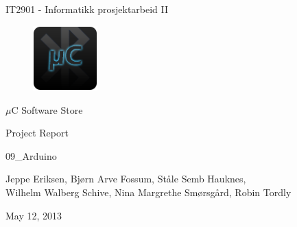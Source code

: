 \begin{titlepage}
\begin{center}
\vspace*{1in}
{\LARGE IT2901 - Informatikk prosjektarbeid II}
\par
\vspace{1cm}


\begin{figure}[ht!]
\centering
\includegraphics[width=25mm]{images/ic_launcher.png}
\label{overflow}
\end{figure}


{\LARGE $\mu$C Software Store}
\par
\vspace{0.6in}
{\LARGE Project Report}
\par
\vspace{0.2in}
{\Large 09\_Arduino}
\par
\vfill
\par
\vspace{0.5in}
Jeppe Eriksen, Bjørn Arve Fossum, Ståle Semb Hauknes,\\ Wilhelm Walberg Schive, Nina Margrethe Smørsgård, Robin Tordly\\
\par
\vspace{0.4cm}
May 12, 2013%
\end{center}
\end{titlepage}

